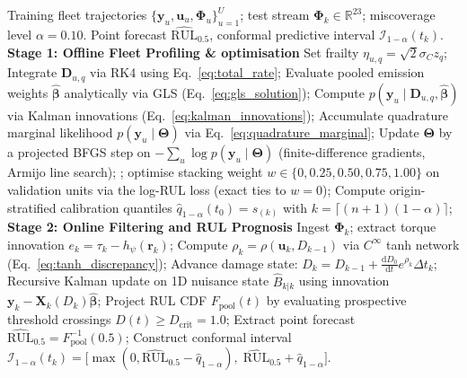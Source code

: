 \documentclass[a4paper,fleqn]{cas-dc}
\newcommand{\Dcrit}{D_{\mathrm{crit}}}
\newcommand{\RUL}{\mathrm{RUL}}
\newcommand{\bPhi}{\bm{\Phi}}
\newcommand{\R}{\mathbb{R}}
\begin{document}
\begin{algorithm}[!t]
\caption{Two-Stage Hierarchical Estimation and Edge State Filtering in KI-SSDM.}
\label{alg:hierarchical_kissdm}
\begin{algorithmic}[1]
\Require Training fleet trajectories $\{\mathbf{y}_u, \mathbf{u}_u, \bPhi_u\}_{u=1}^U$; test stream $\bPhi_k \in \R^{23}$; miscoverage level $\alpha = 0.10$.
\Ensure Point forecast $\widehat{\RUL}_{0.5}$, conformal predictive interval $\mathcal{I}_{1-\alpha}(t_k)$.
\Statex \textbf{Stage 1: Offline Fleet Profiling \& optimisation}
\Repeat
            \State Set frailty $\eta_{u,q} = \sqrt{2}\sigma_C z_q$;
            \State Integrate $\mathbf{D}_{u,q}$ via RK4 using Eq.~\eqref{eq:total_rate};
        \EndFor
    \EndFor
    \State Evaluate pooled emission weights $\hat{\boldsymbol{\beta}}$ analytically via GLS (Eq.~\eqref{eq:gls_solution});
        \State Compute $p(\mathbf{y}_u \mid \mathbf{D}_{u,q}, \hat{\boldsymbol{\beta}})$ via Kalman innovations (Eq.~\eqref{eq:kalman_innovations});
        \State Accumulate quadrature marginal likelihood $p(\mathbf{y}_u \mid \boldsymbol{\Theta})$ via Eq.~\eqref{eq:quadrature_marginal};
    \EndFor
    \State Update $\boldsymbol{\Theta}$ by a projected BFGS step on $-\sum_u \log p(\mathbf{y}_u \mid \boldsymbol{\Theta})$ (finite-difference gradients, Armijo line search);
;
\State optimise stacking weight $w \in \{0, 0.25, 0.50, 0.75, 1.00\}$ on validation units via the log-RUL loss (exact ties to $w=0$);
\State Compute origin-stratified calibration quantiles $\hat{q}_{1-\alpha}(t_0) = s_{(k)}$ with $k = \lceil (n+1)(1-\alpha) \rceil$;
\Statex \textbf{Stage 2: Online Filtering and RUL Prognosis}
\State Ingest $\bPhi_k$; extract torque innovation $e_k = \tau_k - h_\psi(\mathbf{r}_k)$;
\State Compute $\rho_k = \rho(\mathbf{u}_k, D_{k-1})$ via $C^\infty$ tanh network (Eq.~\eqref{eq:tanh_discrepancy});
\State Advance damage state: $D_k = D_{k-1} + \frac{\mathrm{d}D_0}{\mathrm{d}t} e^{\rho_k} \Delta t_k$;
\State Recursive Kalman update on 1D nuisance state $\hat{B}_{k|k}$ using innovation $\mathbf{y}_k - \mathbf{X}_k(D_k) \hat{\boldsymbol{\beta}}$;
\State Project RUL CDF $F_{\mathrm{pool}}(t)$ by evaluating prospective threshold crossings $D(t) \ge \Dcrit = 1.0$;
\State Extract point forecast $\widehat{\RUL}_{0.5} = F_{\mathrm{pool}}^{-1}(0.5)$;
\State Construct conformal interval $\mathcal{I}_{1-\alpha}(t_k) = \bigl[\max(0, \widehat{\RUL}_{0.5} - \hat{q}_{1-\alpha}), \; \widehat{\RUL}_{0.5} + \hat{q}_{1-\alpha}\bigr]$.
\end{algorithmic}
\end{algorithm}
\end{document}
